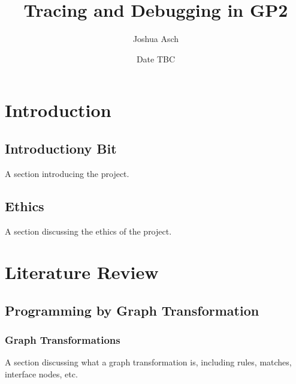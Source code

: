 \documentclass[authoryearcitations]{UoYCSproject}
\author{Joshua Asch}
\title{Tracing and Debugging in GP2}
\date{Date TBC}
\begin{document}
\maketitle
\listoffigures
\listoftables

\cleardoublepage

\chapter{Introduction}
\label{cha:Introduction}

\section{Introductiony Bit}
\label{sec:IntroductionyBit}

A section introducing the project.

\section{Ethics}
\label{sec:Ethics}

A section discussing the ethics of the project.



\clearpage

\chapter{Literature Review}
\label{cha:LiteratureReview}


\section{Programming by Graph Transformation}
\label{sec:ProgrammingByGraphTransformation}


\subsection{Graph Transformations}
\label{sec:GraphTransformations}

A section discussing what a graph transformation is, including rules, matches,
interface nodes, etc.

\end{document}
